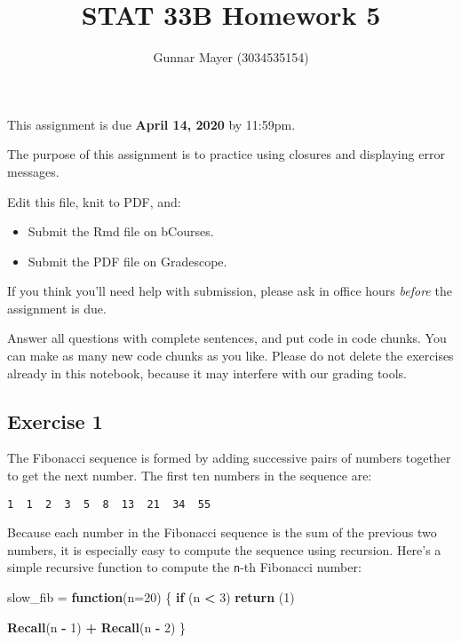 \documentclass[
]{article}
\title{STAT 33B Homework 5}
\author{Gunnar Mayer (3034535154)}
\date{}
\newenvironment{Shaded}{\begin{snugshade}}{\end{snugshade}}
\newcommand{\ControlFlowTok}[1]{\textcolor[rgb]{0.13,0.29,0.53}{\textbf{#1}}}
\newcommand{\DataTypeTok}[1]{\textcolor[rgb]{0.13,0.29,0.53}{#1}}
\newcommand{\DecValTok}[1]{\textcolor[rgb]{0.00,0.00,0.81}{#1}}
\newcommand{\KeywordTok}[1]{\textcolor[rgb]{0.13,0.29,0.53}{\textbf{#1}}}
\newcommand{\NormalTok}[1]{#1}
\newcommand{\OperatorTok}[1]{\textcolor[rgb]{0.81,0.36,0.00}{\textbf{#1}}}
\newcommand{\StringTok}[1]{\textcolor[rgb]{0.31,0.60,0.02}{#1}}
\providecommand{\tightlist}{%
  \setlength{\itemsep}{0pt}\setlength{\parskip}{0pt}}
\begin{document}
\maketitle

This assignment is due \textbf{April 14, 2020} by 11:59pm.

The purpose of this assignment is to practice using closures and
displaying error messages.

Edit this file, knit to PDF, and:

\begin{itemize}
\tightlist
\item
  Submit the Rmd file on bCourses.
\item
  Submit the PDF file on Gradescope.
\end{itemize}

If you think you'll need help with submission, please ask in office
hours \emph{before} the assignment is due.

Answer all questions with complete sentences, and put code in code
chunks. You can make as many new code chunks as you like. Please do not
delete the exercises already in this notebook, because it may interfere
with our grading tools.

\hypertarget{exercise-1}{%
\subsection{Exercise 1}\label{exercise-1}}

The Fibonacci sequence is formed by adding successive pairs of numbers
together to get the next number. The first ten numbers in the sequence
are:

\begin{verbatim}
1  1  2  3  5  8  13  21  34  55
\end{verbatim}

Because each number in the Fibonacci sequence is the sum of the previous
two numbers, it is especially easy to compute the sequence using
recursion. Here's a simple recursive function to compute the
\texttt{n}-th Fibonacci number:

\begin{Shaded}
\begin{Highlighting}[]
\NormalTok{slow_fib =}\StringTok{ }\ControlFlowTok{function}\NormalTok{(}\DataTypeTok{n=}\DecValTok{20}\NormalTok{) \{}
  \ControlFlowTok{if}\NormalTok{ (n }\OperatorTok{<}\StringTok{ }\DecValTok{3}\NormalTok{)}
    \KeywordTok{return}\NormalTok{ (}\DecValTok{1}\NormalTok{)}

  \KeywordTok{Recall}\NormalTok{(n }\OperatorTok{-}\StringTok{ }\DecValTok{1}\NormalTok{) }\OperatorTok{+}\StringTok{ }\KeywordTok{Recall}\NormalTok{(n }\OperatorTok{-}\StringTok{ }\DecValTok{2}\NormalTok{)}
\NormalTok{\}}
\end{Highlighting}
\end{Shaded}
\end{document}
